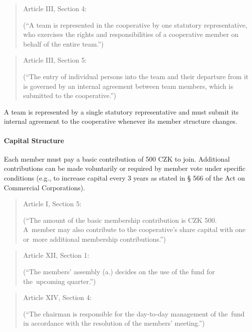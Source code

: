 \begin{quote}
    Article III, Section 4: 

    (\enquote{A team is represented in the cooperative by one statutory representative, who exercises the rights and responsibilities of a cooperative member on behalf of the entire team.})
\end{quote}
\begin{quote}
    Article III, Section 5: 

    (\enquote{The entry of individual persons into the team and their departure from it is governed by an internal agreement between team members, which is submitted to the cooperative.})
\end{quote}

A team is represented by a single statutory representative and must submit its internal agreement to the cooperative whenever its member structure changes.

\paragraph{Capital Structure}
Each member must pay a basic contribution of 500 CZK to join. Additional contributions can be made voluntarily or required by member vote under specific conditions (e.g., to increase capital every 3 years as stated in § 566 of the Act on Commercial Corporations).
\begin{quote}
    Article I, Section 5: 

    (\enquote{The amount of the basic membership contribution is CZK 500. A~member may also contribute to the cooperative's share capital with one or~more additional membership contributions.})
\end{quote}
\begin{quote}
    Article XII, Section 1: 

    (\enquote{The members’ assembly (a.) decides on the use of the fund for the~upcoming quarter.})
\end{quote}
\begin{quote}
    Article XIV, Section 4: 

    (\enquote{The chairman is responsible for the day-to-day management of the~fund in accordance with the resolution of the members’ meeting.})
\end{quote}

